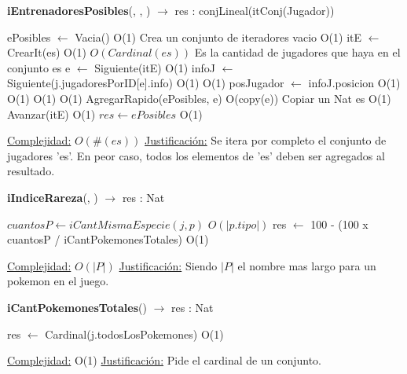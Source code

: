 \begin{algorithm}[H]{\textbf{iEntrenadoresPosibles}(, , )  $\to$ res : conjLineal(itConj(Jugador))} 
	{}
	\begin{algorithmic}
		\State ePosibles $\gets$ Vacia()  \Comment O(1) {Crea un conjunto de iteradores vacio}
			\Comment O(1)
			\State itE $\gets$ CrearIt(es)	\Comment O(1)
			 \Comment $O(Cardinal(es))$ {Es la cantidad de jugadores que haya en el conjunto es}
				\State e $\gets$ Siguiente(itE)	\Comment O(1)
				\State infoJ $\gets$ Siguiente(j.jugadoresPorID[e].info)	\Comment O(1)
					\Comment O(1)
					\State posJugador $\gets$ infoJ.posicion	\Comment O(1)
						\Comment O(1)
					 		\Comment O(1)
					 			\Comment O(1)
								\State AgregarRapido(ePosibles, e)	\Comment O(copy(e)) {Copiar un Nat es O(1)}
							\EndIf
						\EndIf
					\EndIf
				\EndIf
				\State Avanzar(itE)	\Comment O(1)
			\EndWhile
		\EndIf
		\State $res \gets ePosibles$ \Comment O(1)
	
		\medskip
		\Statex \underline{Complejidad:} $O(\#(es))$
		\Statex \underline{Justificación:} Se itera por completo el conjunto de jugadores 'es'. En peor caso, todos los elementos de 'es' deben ser agregados al resultado.
    \end{algorithmic}
\end{algorithm}

\begin{algorithm}[H]{\textbf{iIndiceRareza}(, )  $\to$ res : Nat} 
	{}
	\begin{algorithmic}
		\State $cuantosP \gets iCantMismaEspecie(j, p) $ \Comment $O(|p.tipo|)$
		\State res $\gets$ 100 - (100 x cuantosP / iCantPokemonesTotales)  \Comment O(1)
	
		\medskip
		\Statex \underline{Complejidad:} $O(|P|)$
		\Statex \underline{Justificación:} Siendo $|P|$ el nombre mas largo para un pokemon en el juego.
    \end{algorithmic}
\end{algorithm}

\begin{algorithm}[H]{\textbf{iCantPokemonesTotales}() $\to$ res : Nat} 
	{}
	\begin{algorithmic}
		\State res $\gets$ Cardinal(j.todosLosPokemones)	\Comment O(1)
	
		\medskip
		\Statex \underline{Complejidad:} O(1)
		\Statex \underline{Justificación:} Pide el cardinal de un conjunto.
    \end{algorithmic}
\end{algorithm}

